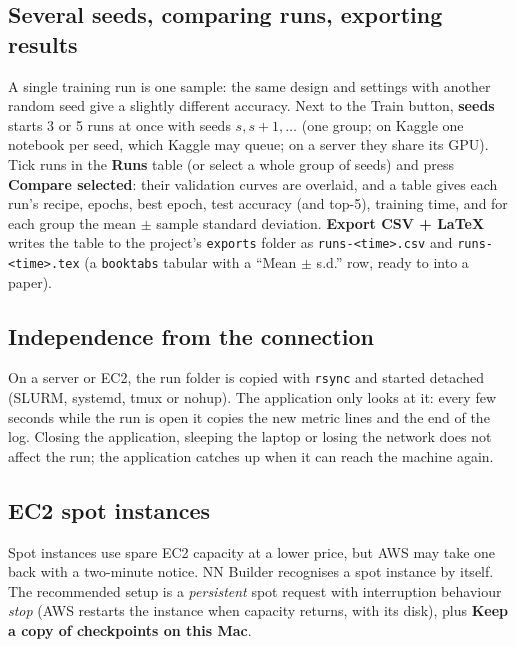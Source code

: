 \documentclass[11pt,a4paper]{article}
\newcommand{\ui}[1]{\textbf{\textsf{#1}}}
\newcommand{\file}[1]{\texttt{#1}}
\begin{document}
\subsection{Several seeds, comparing runs, exporting results}
\label{sec:compare}
A single training run is one sample: the same design and settings with another random seed give a slightly different accuracy. Next to
the Train button, \ui{seeds} starts 3 or 5 runs at once with seeds $s, s{+}1, \ldots$ (one group; on Kaggle one notebook per seed, which
Kaggle may queue; on a server they share its GPU). Tick runs in the \ui{Runs} table (or select a whole group of seeds) and press
\ui{Compare selected}: their validation curves are overlaid, and a table gives each run's recipe, epochs, best epoch, test accuracy
(and top-5), training time, and for each group the mean $\pm$ sample standard deviation. \ui{Export CSV + LaTeX} writes the table to the
project's \file{exports} folder as \file{runs-<time>.csv} and \file{runs-<time>.tex} (a \texttt{booktabs} tabular with a
``Mean $\pm$ s.d.'' row, ready to \verb|| into a paper).

\subsection{Independence from the connection}
On a server or EC2, the run folder is copied with \texttt{rsync} and started detached (SLURM, systemd, tmux or nohup). The application only
looks at it: every few seconds while the run is open it copies the new metric lines and the end of the log. Closing the application,
sleeping the laptop or losing the network does not affect the run; the application catches up when it can reach the machine again.

\subsection{EC2 spot instances}
\label{sec:spot}
Spot instances use spare EC2 capacity at a lower price, but AWS may take one back with a two-minute notice. NN Builder recognises a spot
instance by itself. The recommended setup is a \emph{persistent} spot request with interruption behaviour \emph{stop} (AWS restarts the
instance when capacity returns, with its disk), plus \ui{Keep a copy of checkpoints on this Mac}.
\end{document}
